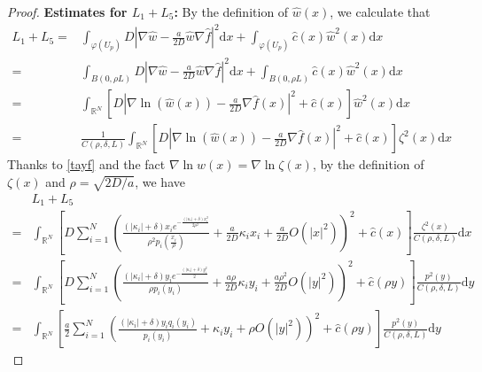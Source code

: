\documentclass[12pt,reqno]{amsart}
\numberwithin{equation}{section}
\begin{document}
\begin{proof}

\textbf{Estimates for $L_1+L_5$:} 
By the definition of $\hat{w}(x)$, we calculate that
\begin{align*}
L_1+L_5=&
\int_{\varphi(U_p)} D  \left|\nabla \hat{w} -
  \frac{a}{2D} \hat{w} \nabla \hat{f} \right|^2\mathrm{d} x
  +\int_{\varphi(U_p)} \hat{c}(x) \hat{w}^2(x) \mathrm{d} x\\
  =&
\int_{B(0,\rho L)} D  \left|\nabla \hat{w} -
  \frac{a}{2D} \hat{w} \nabla \hat{f} \right|^2\mathrm{d} x
  +\int_{B(0,\rho L)} \hat{c}(x) \hat{w}^2(x) \mathrm{d} x
  \\=&
  \int_{\mathbb{R}^N} \left[ D  \left|\nabla \ln(\hat{w}(x)) -
  \frac{a}{2D} \nabla \hat{f}(x) \right|^2+\hat{c}(x) \right] \hat{w}^2(x) \mathrm{d}x
  \\=&
 \frac{1}{C(\rho,\delta,L)} \int_{\mathbb{R}^N} \left[ D  \left|\nabla \ln(\hat{w}(x)) -
  \frac{a}{2D} \nabla \hat{f}(x) \right|^2+\hat{c}(x) \right] \zeta^2(x) \mathrm{d}x
 \end{align*}
Thanks to \eqref{tayf} and the fact $\nabla \ln\hat{w}(x)=\nabla \ln \zeta(x)$, by the definition of $\zeta(x)$ and \(\rho = \sqrt{2D/a}\), we have
\begin{align*}
\!\!&L_1+L_5\\
=\!&
 \int_{\mathbb{R}^N} \left[D\sum_{i=1}^N\left(\frac{(|\kappa_i|+\delta)x_ie^{-\frac{(|\kappa_i|+\delta)x_i^2}{2\rho^2}}}{\rho^2 p_i(\frac{x_i}{\rho})}
 +\frac{a}{2D}\kappa_ix_i
 +\frac{a}{2D}O(|x|^2)\right)^2+\hat{c}(x) \right]  
 \frac{\zeta^2(x)}{C(\rho,\delta,L)}\mathrm{d}x
  \\= \!&
\int_{\mathbb{R}^N} \left[ D\sum_{i=1}^N\left(\frac{(|\kappa_i|+\delta)y_ie^{-\frac{(|\kappa_i|+\delta)y_i^2}{2}}}
 {\rho p_i(y_i)}+\frac{a \rho}{2D}\kappa_iy_i+\frac{a\rho^2}{2D} O(|y|^2)\right)^2
 +\hat{c}(\rho y) \right]
  \frac{p^2(y)}{C(\rho,\delta,L)} \mathrm{d}y
  \\= \!&
 \int_{\mathbb{R}^N} 
 \left[\frac{a}{2}\sum_{i=1}^N\left(\frac{(|\kappa_i|+\delta)y_i
 q_i(y_i)}
 { p_i(y_i)}+ \kappa_iy_i+ \rho O(|y|^2)\right)^2
 +\hat{c}(\rho y) \right] 
  \frac{p^2(y)}{C(\rho,\delta,L)} \mathrm{d}y

\end{align*}
\end{proof}
\end{document}
